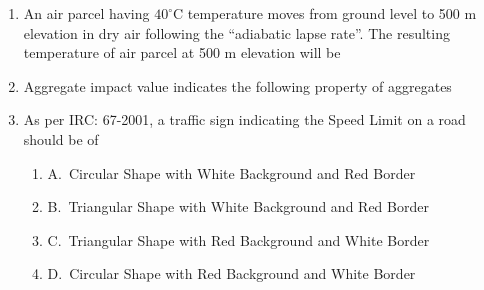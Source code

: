 \documentclass[journal,12pt,onecolumn]{IEEEtran}
\theoremstyle{remark}
\begin{document}
\begin{enumerate}
\noindent\item An air parcel having $40^\circ\mathrm{C}$ temperature moves from ground level to 500 m elevation in dry air following the ``adiabatic lapse rate''. The resulting temperature of air parcel at 500 m elevation will be
\hfill{}
\begin{enumerate}
\end{enumerate}
\noindent\item Aggregate impact value indicates the following property of aggregates
\hfill{}
\begin{enumerate}
\end{enumerate}
\noindent\item As per IRC: 67-2001, a traffic sign indicating the Speed Limit on a road should be of               
\hfill{}
\begin{enumerate}[label=]
    
\item A.\ Circular Shape with White Background and Red Border \\
\item B.\ Triangular Shape with White Background and Red Border \\
\item C.\ Triangular Shape with Red Background and White Border \\
\item D.\ Circular Shape with Red Background and White Border
\end{enumerate}


\end{enumerate}
\end{document}
